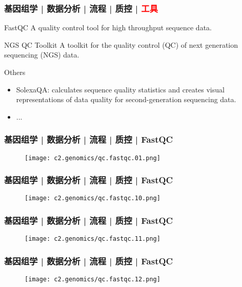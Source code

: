 \begin{frame}
  \frametitle{基因组学 | 数据分析 | 流程 | 质控 | \textcolor{red}{工具}}
  \begin{block}{FastQC}
    A quality control tool for high throughput sequence data.
  \end{block}
  \pause
  \begin{block}{NGS QC Toolkit}
    A toolkit for the quality control (QC) of next generation sequencing (NGS) data.
  \end{block}
  \pause
  \begin{block}{Others}
    \begin{itemize}
      \item SolexaQA: calculates sequence quality statistics and creates visual representations of data quality for second-generation sequencing data.
      \item ...
    \end{itemize}
  \end{block}
\end{frame}

\begin{frame}
  \frametitle{基因组学 | 数据分析 | 流程 | 质控 | FastQC}
  \begin{figure}
    \centering
    \texttt{[image: c2.genomics/qc.fastqc.01.png]}
  \end{figure}
\end{frame}

\begin{frame}
  \frametitle{基因组学 | 数据分析 | 流程 | 质控 | FastQC}
  \begin{figure}
    \centering
    \texttt{[image: c2.genomics/qc.fastqc.10.png]}
  \end{figure}
\end{frame}

\begin{frame}
  \frametitle{基因组学 | 数据分析 | 流程 | 质控 | FastQC}
  \begin{figure}
    \centering
    \texttt{[image: c2.genomics/qc.fastqc.11.png]}
  \end{figure}
\end{frame}

\begin{frame}
  \frametitle{基因组学 | 数据分析 | 流程 | 质控 | FastQC}
  \begin{figure}
    \centering
    \texttt{[image: c2.genomics/qc.fastqc.12.png]}
  \end{figure}
\end{frame}

